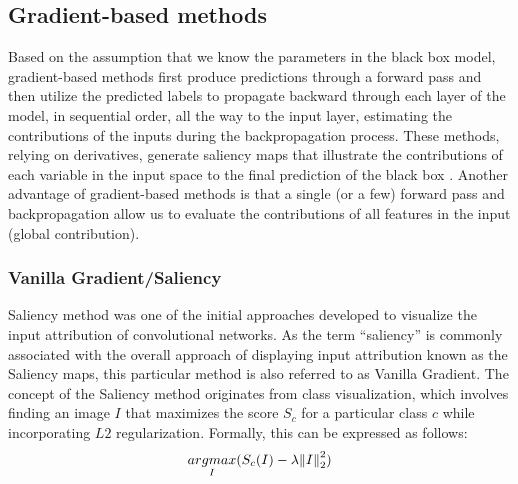 \subsection{Gradient-based methods}
\label{subsec: gradientMethods}

Based on the assumption that we know the parameters in the black box model, gradient-based methods first produce predictions through a forward pass and then utilize the predicted labels to propagate backward through each layer of the model, in sequential order, all the way to the input layer, estimating the contributions of the inputs during the backpropagation process. These methods, relying on derivatives, generate saliency maps that illustrate the contributions of each variable in the input space to the final prediction of the black box \cite{gradientBased}. Another advantage of gradient-based methods is that a single (or a few) forward pass and backpropagation allow us to evaluate the contributions of all features in the input (global contribution).

\subsubsection{Vanilla Gradient/Saliency}
\label{subsubsec: grad}
Saliency method \cite{saliencyMaps} was one of the initial approaches developed to visualize the input attribution of convolutional networks. As the term ``saliency'' is commonly associated with the overall approach of displaying input attribution known as the Saliency maps, this particular method is also referred to as Vanilla Gradient.
The concept of the Saliency method originates from class visualization, which involves finding an image $I$ that maximizes the score $S_c$ for a particular class $c$ while incorporating $L2$ regularization. Formally, this can be expressed as follows:
\begin{equation}
    \underset{I}{argmax}(S_c (I) - \lambda \norm{I} ^2_2)
\end{equation}

